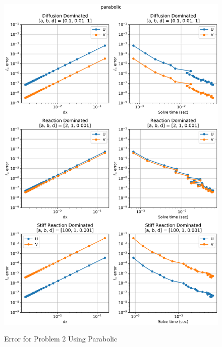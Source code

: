 \begin{figure}[t]
  \centering
  \includegraphics[width=5.75in]{images/parabolicproblem2.png}\\
  \caption{Error for Problem 2 Using Parabolic}
  \label{fig:errorProblem2parabolic}
\end{figure} 

